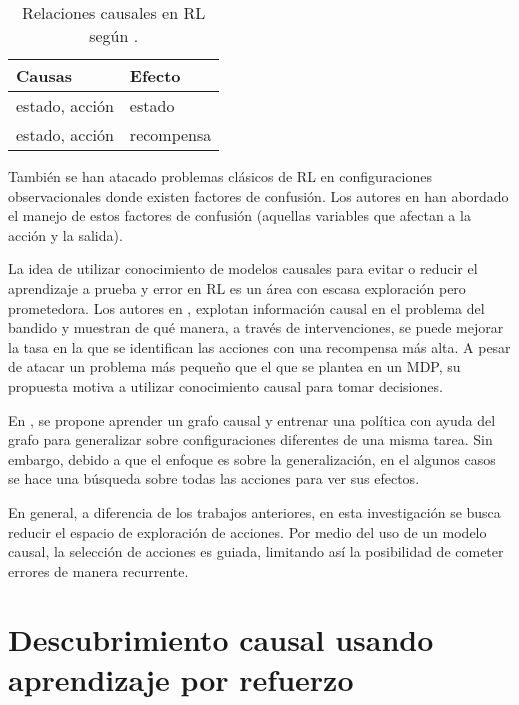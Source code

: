 \begin{table}[h]
\centering
\caption{Relaciones causales en RL según \cite{Gershman2017}.}
\begin{tabular}{@{}ll@{}}
\toprule
Causas         & Efecto     \\ \midrule
estado, acción & estado     \\
estado, acción & recompensa \\ \bottomrule
\end{tabular}
\end{table}

También se han atacado problemas clásicos de RL 
en configuraciones observacionales donde existen factores de confusión. Los autores en \cite{bareinboim2015bandits, lu2018deconfounding}
han abordado el manejo de estos factores de confusión (aquellas variables que afectan a la acción y la salida).

La idea de utilizar conocimiento de modelos
causales para evitar o reducir el aprendizaje a 
prueba y error en RL es un área con escasa 
exploración pero prometedora.
Los autores en \cite{lattimore2016causal},
explotan información causal en el problema
del bandido y muestran de qué manera, a través
de intervenciones, se puede mejorar la
tasa en la que se identifican las acciones
con una recompensa más alta. A pesar de atacar un problema más pequeño
que el que se plantea en un MDP, su propuesta motiva a utilizar 
conocimiento causal para tomar decisiones.


En \cite{nair2019causal}, se propone
aprender un grafo causal y
entrenar una política con ayuda del grafo para generalizar sobre 
configuraciones diferentes de una misma
tarea.
Sin embargo, debido a que el enfoque es sobre la generalización, en el algunos casos
se hace una búsqueda sobre todas las acciones para ver sus efectos.


En general, a diferencia de los trabajos anteriores,
en esta investigación se busca reducir el espacio de exploración
de acciones. 
Por medio del uso de un modelo causal, la selección de acciones es guiada, limitando así la posibilidad de cometer errores de manera recurrente.

\section{Descubrimiento causal usando aprendizaje por refuerzo}

